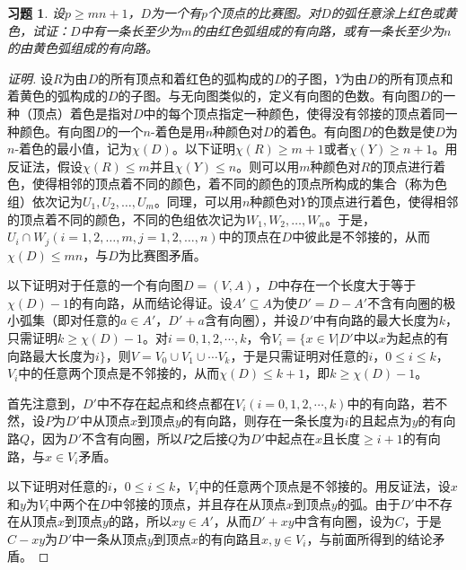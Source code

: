\documentclass{article}
\begin{document}
\begin{CJK}{UTF8}{gbsn}
\newtheorem*{Exercise}{习题}
\begin{Exercise}
设$p\geq mn+1$，$D$为一个有$p$个顶点的比赛图。对$D$的弧任意涂上红色或黄色，试证：$D$中有一条长至少为$m$的由红色弧组成的有向路，或有一条长至少为$n$的由黄色弧组成的有向路。
\end{Exercise}
\begin{proof}[证明]
  设$R$为由$D$的所有顶点和着红色的弧构成的$D$的子图，$Y$为由$D$的所有顶点和着黄色的弧构成的$D$的子图。与无向图类似的，定义有向图的色数。有向图$D$的一种（顶点）着色是指对$D$中的每个顶点指定一种颜色，使得没有邻接的顶点着同一种颜色。有向图$D$的一个$n$-着色是用$n$种颜色对$D$的着色。有向图$D$的色数是使$D$为$n$-着色的最小值，记为$\chi(D)$。以下证明$\chi(R)\geq m+1$或者$\chi(Y)\geq n+1$。用反证法，假设$\chi(R)\leq m$并且$\chi(Y)\leq n$。则可以用$m$种颜色对$R$的顶点进行着色，使得相邻的顶点着不同的颜色，着不同的颜色的顶点所构成的集合（称为色组）依次记为$U_1,U_2,\ldots,U_m$。同理，可以用$n$种颜色对$Y$的顶点进行着色，使得相邻的顶点着不同的颜色，不同的色组依次记为$W_1,W_2,\ldots,W_n$。于是，$U_i\cap W_j (i=1,2,\ldots,m, j=1,2,\ldots,n)$中的顶点在$D$中彼此是不邻接的，从而$\chi(D)\leq mn$，与$D$为比赛图矛盾。

  以下证明对于任意的一个有向图$D=(V,A)$，$D$中存在一个长度大于等于$\chi(D)-1$的有向路，从而结论得证。设$A'\subseteq A$为使$D'=D-A'$不含有向圈的极小弧集（即对任意的$a\in A'$，$D'+a$含有向圈），并设$D'$中有向路的最大长度为$k$，只需证明$k\geq \chi(D)-1$。对$i=0,1,2,\cdots,k$，令$V_i=\{x\in V|D'$中以$x$为起点的有向路最大长度为$i\}$，则$V=V_0\cup V_1\cup \cdots V_k$，于是只需证明对任意的$i$，$0\leq i \leq k$，$V_i$中的任意两个顶点是不邻接的，从而$\chi(D) \leq k+1$，即$k\geq \chi(D) - 1$。

  首先注意到，$D'$中不存在起点和终点都在$V_i(i=0,1,2,\cdots,k)$中的有向路，若不然，设$P$为$D'$中从顶点$x$到顶点$y$的有向路，则存在一条长度为$i$的且起点为$y$的有向路$Q$，因为$D'$不含有向圈，所以$P$之后接$Q$为$D'$中起点在$x$且长度$\geq i+1$的有向路，与$x\in V_i$矛盾。

  以下证明对任意的$i$，$0\leq i \leq k$，$V_i$中的任意两个顶点是不邻接的。用反证法，设$x$和$y$为$V_i$中两个在$D$中邻接的顶点，并且存在从顶点$x$到顶点$y$的弧。由于$D'$中不存在从顶点$x$到顶点$y$的路，所以$xy\in A'$，从而$D'+xy$中含有向圈，设为$C$，于是$C-xy$为$D'$中一条从顶点$y$到顶点$x$的有向路且$x,y\in V_i$，与前面所得到的结论矛盾。
\end{proof}
\end{CJK}
\end{document}
